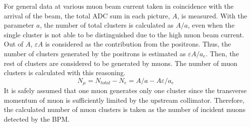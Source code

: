 \documentclass[preprint,3p,twocolumn]{elsarticle}
\begin{document}
For general data at various muon beam current taken in coincidence with the arrival of the beam, the total ADC sum in each picture, $A$, is measured. With the parameter $a$, the number of total clusters is calculated as $A/a$, even when the single cluster is not able to be distinguished due to the high muon beam current.
Out of $A$, $\varepsilon A$ is considered as the contribution from the positrons. Thus, the number of clusters generated by the positrons is estimated as $\varepsilon A/a_e$. Then, the rest of clusters are considered to be generated by muons. The number of muon clusters is calculated with this reasoning.
\begin{equation}
    N_{\mu} = N_{total} - N_{e}
    = A/a - A\varepsilon/a_e
\end{equation}
It is safely assumed that one muon generates only one cluster since the transverse momentum of muon is sufficiently limited by the upstream collimator. Therefore, the calculated number of muon clusters is taken as the number of incident muons detected by the BPM.
\end{document}
